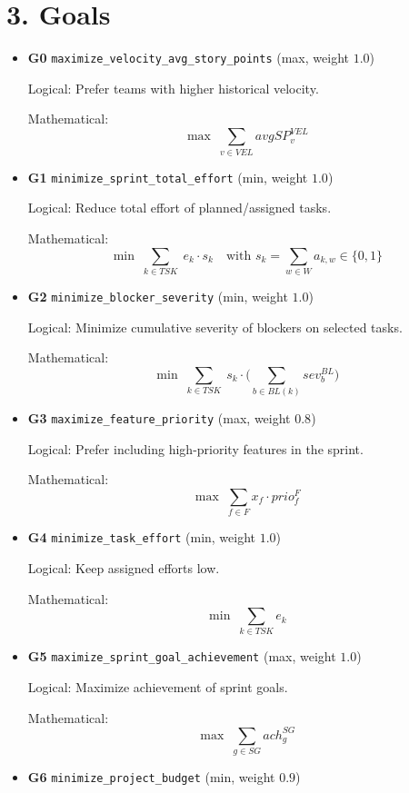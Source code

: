 \documentclass[11pt,a4paper]{article}
\begin{document}
\section{3. Goals}
\begin{itemize}[leftmargin=2em]
  \item \textbf{G0} \texttt{maximize\_velocity\_avg\_story\_points} (max, weight $1.0$)\par
        Logical: Prefer teams with higher historical velocity.\par
        Mathematical:
        \[
          \max \; \sum_{v\in VEL} avgSP^{VEL}_v
        \]
  \item \textbf{G1} \texttt{minimize\_sprint\_total\_effort} (min, weight $1.0$)\par
        Logical: Reduce total effort of planned/assigned tasks.\par
        Mathematical:
        \[
          \min \; \sum_{k\in TSK}\; e_{k}\cdot s_{k}
          \quad\text{with } s_{k}=\sum_{w\in W} a_{k,w}\in\{0,1\}
        \]
  \item \textbf{G2} \texttt{minimize\_blocker\_severity} (min, weight $1.0$)\par
        Logical: Minimize cumulative severity of blockers on selected tasks.\par
        Mathematical:
        \[
          \min \; \sum_{k\in TSK}\; s_{k}\cdot \Big(\sum_{b\in BL(k)} sev^{BL}_b\Big)
        \]
  \item \textbf{G3} \texttt{maximize\_feature\_priority} (max, weight $0.8$)\par
        Logical: Prefer including high-priority features in the sprint.\par
        Mathematical:
        \[
          \max \; \sum_{f\in F} x_f \cdot prio^{F}_f
        \]
  \item \textbf{G4} \texttt{minimize\_task\_effort} (min, weight $1.0$)\par
        Logical: Keep assigned efforts low.\par
        Mathematical:
        \[
          \min \; \sum_{k\in TSK} e_k
        \]
  \item \textbf{G5} \texttt{maximize\_sprint\_goal\_achievement} (max, weight $1.0$)\par
        Logical: Maximize achievement of sprint goals.\par
        Mathematical:
        \[
          \max \; \sum_{g\in SG} ach^{SG}_g
        \]
  \item \textbf{G6} \texttt{minimize\_project\_budget} (min, weight $0.9$)\par

\end{itemize}
\end{document}

